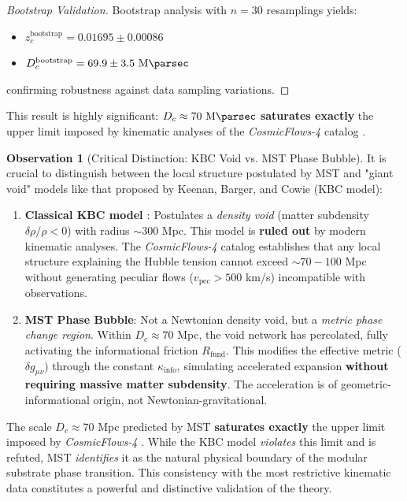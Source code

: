 \documentclass[11pt, a4paper]{article}
\theoremstyle{plain}
\theoremstyle{definition}
\newtheorem{observation}[theorem]{Observation}
\newcommand{\Rfactor}{R_{\text{fund}}}
\newcommand{\Kinfo}{\kappa_{\text{info}}}
\begin{document}
\begin{proof}[Bootstrap Validation]
Bootstrap analysis with $n=30$ resamplings yields:
\begin{itemize}
    \item $z_c^{\text{bootstrap}} = 0.01695 \pm 0.00086$
    \item $D_c^{\text{bootstrap}} = 69.9 \pm 3.5\ \si{\mega\parsec}$
\end{itemize}
confirming robustness against data sampling variations.
\end{proof}

This result is highly significant: $D_c \approx 70\ \si{\mega\parsec}$ \textbf{saturates exactly} the upper limit imposed by kinematic analyses of the \textit{CosmicFlows-4} catalog \cite{Mazurenko2024}.

\begin{observation}[Critical Distinction: KBC Void vs. MST Phase Bubble]
\label{obs:kbc_vs_tsm}
It is crucial to distinguish between the local structure postulated by MST and "giant void" models like that proposed by Keenan, Barger, and Cowie (KBC model):

\begin{enumerate}
    \item \textbf{Classical KBC model \cite{KBC2010}}: Postulates a \textit{density void} (matter subdensity $\delta\rho/\rho < 0$) with radius $\sim 300$ Mpc. This model is \textbf{ruled out} by modern kinematic analyses. The \textit{CosmicFlows-4} catalog \cite{Mazurenko2024} establishes that any local structure explaining the Hubble tension cannot exceed $\sim 70-100$ Mpc without generating peculiar flows ($v_{\text{pec}} > 500$ km/s) incompatible with observations.

    \item \textbf{MST Phase Bubble}: Not a Newtonian density void, but a \textit{metric phase change region}. Within $D_c \approx 70$ Mpc, the void network has percolated, fully activating the informational friction $\Rfactor$. This modifies the effective metric ($\delta g_{\mu\nu}$) through the constant $\Kinfo$, simulating accelerated expansion \textbf{without requiring massive matter subdensity}. The acceleration is of geometric-informational origin, not Newtonian-gravitational.
\end{enumerate}

The scale $D_c \approx 70$ Mpc predicted by MST \textbf{saturates exactly} the upper limit imposed by \textit{CosmicFlows-4} \cite{Mazurenko2024}. While the KBC model \textit{violates} this limit and is refuted, MST \textit{identifies} it as the natural physical boundary of the modular substrate phase transition. This consistency with the most restrictive kinematic data constitutes a powerful and distinctive validation of the theory.
\end{observation}
\end{document}
